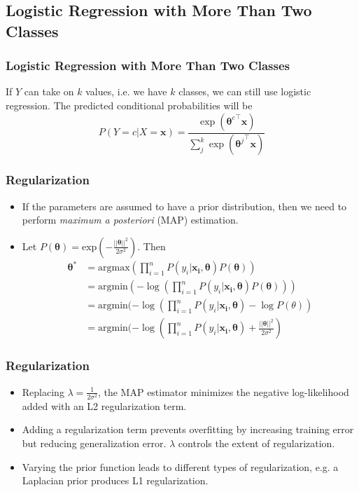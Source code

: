 \documentclass{beamer}
\begin{document}
\subsection{Logistic Regression with More Than Two Classes}
\begin{frame}
\frametitle{Logistic Regression with More Than Two Classes}
If $Y$ can take on $k$ values, i.e. we have $k$ classes, we can still use logistic regression. The predicted conditional probabilities will be 
\begin{equation}
P(Y = c | X = \mathbf{x}) = \frac{\exp ({{\bm{\theta}}^{c}}^ {\intercal} \mathbf{x})} { \sum_{j}^{k} \exp({{\bm{\theta}}^{j}}^ {\intercal}\mathbf{x}) }
\end{equation}
\end{frame}
\begin{frame}
\frametitle{Regularization}
\begin{itemize}
\item If the parameters are assumed to have a prior distribution, then we need to perform \textit{maximum a posteriori} (MAP) estimation.
\item Let $P(\mathbf{\theta}) = \text{exp}(-\frac{||\mathbf{\theta}||^2}{2 \sigma^2})$. Then
\begin{equation}
\begin{split}
\mathbf{\theta}^* &= \text{argmax} (\prod_{i=1}^n P(y_i|\mathbf{x_i, \theta}) P(\mathbf{\theta}))\\
&= \text{argmin} (-\log (\prod_{i=1}^n P(y_i|\mathbf{x_i, \theta}) P(\mathbf{\theta})))\\
&= \text{argmin} (-\log (\prod_{i=1}^n P(y_i|\mathbf{x_i, \theta}) - \log P(\theta))\\
&= \text{argmin} (-\log (\prod_{i=1}^n P(y_i|\mathbf{x_i, \theta}) + \frac{||\mathbf{\theta}||^2}{2 \sigma^2})
\end{split}
\end{equation}
\end{itemize}
\end{frame}
\begin{frame}
\frametitle{Regularization}
\begin{itemize}
\item Replacing $\lambda = \frac{1}{2 \sigma^2}$, the MAP estimator minimizes the negative log-likelihood added with an L2 regularization term.
\item Adding a regularization term prevents overfitting by increasing training error but reducing generalization error. $\lambda$ controls the extent of regularization.
\item Varying the prior function leads to different types of regularization, e.g. a Laplacian prior produces L1 regularization.
\end{itemize}
\end{frame}
\end{document}

